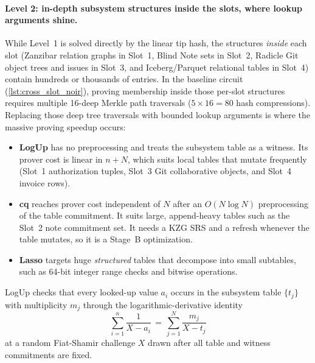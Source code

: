 \documentclass[a4paper,11pt,twoside,parskip=half-,headings=small]{scrartcl}
\begin{document}
\paragraph{Level 2: in-depth subsystem structures inside the slots, where lookup arguments shine.}
While Level~1 is solved directly by the linear tip hash, the structures \emph{inside} each slot (Zanzibar relation graphs in Slot~1, Blind Note sets in Slot~2, Radicle Git object trees and issues in Slot~3, and Iceberg/Parquet relational tables in Slot~4) contain hundreds or thousands of entries. In the baseline circuit (\cref{lst:cross_slot_noir}), proving membership inside those per-slot structures requires multiple 16-deep Merkle path traversals ($5 \times 16 = 80$ hash compressions). Replacing those deep tree traversals with bounded lookup arguments is where the massive proving speedup occurs:
\begin{itemize}[nosep]
  \item \textbf{LogUp} has no preprocessing and treats the subsystem table as a witness. Its prover cost is linear in $n + N$, which suits local tables that mutate frequently (Slot~1 authorization tuples, Slot~3 Git collaborative objects, and Slot~4 invoice rows).
  \item \textbf{cq} reaches prover cost independent of $N$ after an $O(N \log N)$ preprocessing of the table commitment. It suits large, append-heavy tables such as the Slot~2 note commitment set. It needs a KZG SRS and a refresh whenever the table mutates, so it is a Stage~B optimization.
  \item \textbf{Lasso} targets huge \emph{structured} tables that decompose into small subtables, such as 64-bit integer range checks and bitwise operations.
\end{itemize}
LogUp checks that every looked-up value $a_i$ occurs in the subsystem table $\{t_j\}$ with multiplicity $m_j$ through the logarithmic-derivative identity
\begin{equation}
  \sum_{i=1}^{n} \frac{1}{X - a_i} \,=\, \sum_{j=1}^{N} \frac{m_j}{X - t_j}
\end{equation}
at a random Fiat-Shamir challenge $X$ drawn after all table and witness commitments are fixed.
\end{document}
